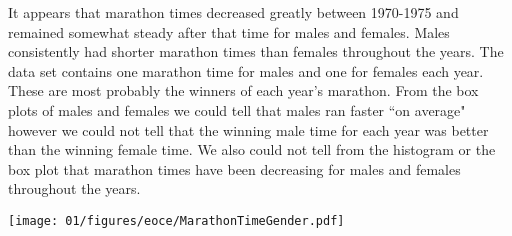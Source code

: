 %

\noindent\begin{minipage}[c]{0.45\textwidth}
{
It appears that marathon times decreased greatly between 1970-1975 and remained somewhat steady after that time for males and females. Males consistently had shorter marathon times than females throughout the years. The data set contains one marathon time for males and one for females each year. These are most probably the winners of each year's marathon. From the box plots of males and females we could tell that males ran faster ``on average" however we could not tell that the winning male time for each year was better than the winning female time. We also could not tell from the histogram or the box plot that marathon times have been decreasing for males and females throughout the years.
}
\end{minipage}
\begin{minipage}[c]{0.55\textwidth}
\begin{center}
\texttt{[image: 01/figures/eoce/MarathonTimeGender.pdf]}
\end{center}
\end{minipage}
\vspace{2mm}

%

